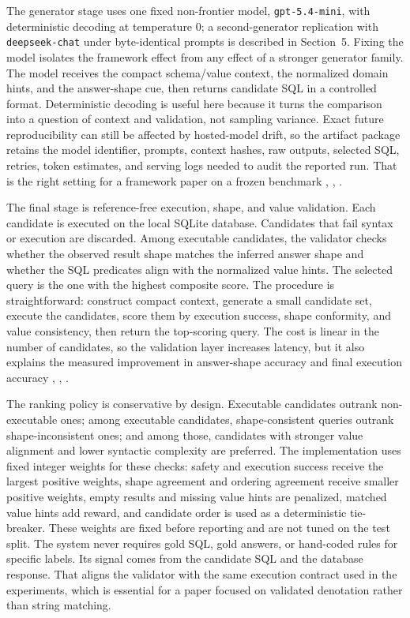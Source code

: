 \documentclass{ieeeaccess}
\begin{document}
The generator stage uses one fixed non-frontier model, \texttt{gpt-5.4-mini}, with deterministic decoding at temperature 0; a second-generator replication with \texttt{deepseek-chat} under byte-identical prompts is described in Section~5. Fixing the model isolates the framework effect from any effect of a stronger generator family. The model receives the compact schema/value context, the normalized domain hints, and the answer-shape cue, then returns candidate SQL in a controlled format. Deterministic decoding is useful here because it turns the comparison into a question of context and validation, not sampling variance. Exact future reproducibility can still be affected by hosted-model drift, so the artifact package retains the model identifier, prompts, context hashes, raw outputs, selected SQL, retries, token estimates, and serving logs needed to audit the reported run. That is the right setting for a framework paper on a frozen benchmark \cite{chang2023prompt}, \cite{nan2023enhancing}, \cite{sun2023sqlprompt}.

The final stage is reference-free execution, shape, and value validation. Each candidate is executed on the local SQLite database. Candidates that fail syntax or execution are discarded. Among executable candidates, the validator checks whether the observed result shape matches the inferred answer shape and whether the SQL predicates align with the normalized value hints. The selected query is the one with the highest composite score. The procedure is straightforward: construct compact context, generate a small candidate set, execute the candidates, score them by execution success, shape conformity, and value consistency, then return the top-scoring query. The cost is linear in the number of candidates, so the validation layer increases latency, but it also explains the measured improvement in answer-shape accuracy and final execution accuracy \cite{wang2021executions}, \cite{li2024select}, \cite{huang2024survey}.

The ranking policy is conservative by design. Executable candidates outrank non-executable ones; among executable candidates, shape-consistent queries outrank shape-inconsistent ones; and among those, candidates with stronger value alignment and lower syntactic complexity are preferred. The implementation uses fixed integer weights for these checks: safety and execution success receive the largest positive weights, shape agreement and ordering agreement receive smaller positive weights, empty results and missing value hints are penalized, matched value hints add reward, and candidate order is used as a deterministic tie-breaker. These weights are fixed before reporting and are not tuned on the test split. The system never requires gold SQL, gold answers, or hand-coded rules for specific labels. Its signal comes from the candidate SQL and the database response. That aligns the validator with the same execution contract used in the experiments, which is essential for a paper focused on validated denotation rather than string matching.
\end{document}
